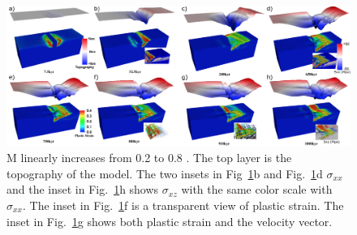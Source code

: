 \begin{figure}[hc]
  \centering
    \includegraphics[width=1.0\textwidth]{fig_Results1_1.png}
  \caption{ M linearly increases from 0.2 to 0.8 . The top layer is the  topography of the model. %
The two insets in Fig~\ref{fig_Results1_1}b and Fig.~\ref{fig_Results1_1}d  $\sigma_{xx}$ %
and the inset in Fig.~\ref{fig_Results1_1}h shows $\sigma_{xz}$ with the same color scale with $\sigma_{xx}$. The inset in Fig.~\ref{fig_Results1_1}f is a transparent view of plastic strain. The inset in Fig.~\ref{fig_Results1_1}g shows both plastic strain and the velocity vector. %
}
 \label{fig_Results1_1}
\end{figure}   

